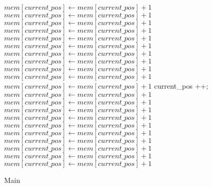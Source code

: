 \documentclass[8pt]{article}
\begin{document}
\begin{algorithm}[H]
$mem[current\_pos] \leftarrow mem[current\_pos] + 1 $\;
$mem[current\_pos] \leftarrow mem[current\_pos] + 1 $\;
$mem[current\_pos] \leftarrow mem[current\_pos] + 1 $\;
$mem[current\_pos] \leftarrow mem[current\_pos] + 1 $\;
$mem[current\_pos] \leftarrow mem[current\_pos] + 1 $\;
$mem[current\_pos] \leftarrow mem[current\_pos] + 1 $\;
$mem[current\_pos] \leftarrow mem[current\_pos] + 1 $\;
$mem[current\_pos] \leftarrow mem[current\_pos] + 1 $\;
$mem[current\_pos] \leftarrow mem[current\_pos] + 1 $\;
$mem[current\_pos] \leftarrow mem[current\_pos] + 1 $\;
$mem[current\_pos] \leftarrow mem[current\_pos] + 1 $\;
current\_pos ++;
$mem[current\_pos] \leftarrow mem[current\_pos] + 1 $\;
$mem[current\_pos] \leftarrow mem[current\_pos] + 1 $\;
$mem[current\_pos] \leftarrow mem[current\_pos] + 1 $\;
$mem[current\_pos] \leftarrow mem[current\_pos] + 1 $\;
$mem[current\_pos] \leftarrow mem[current\_pos] + 1 $\;
$mem[current\_pos] \leftarrow mem[current\_pos] + 1 $\;
$mem[current\_pos] \leftarrow mem[current\_pos] + 1 $\;
$mem[current\_pos] \leftarrow mem[current\_pos] + 1 $\;
$mem[current\_pos] \leftarrow mem[current\_pos] + 1 $\;
$mem[current\_pos] \leftarrow mem[current\_pos] + 1 $\;
\caption{Main}
\end{algorithm}
\end{document}
